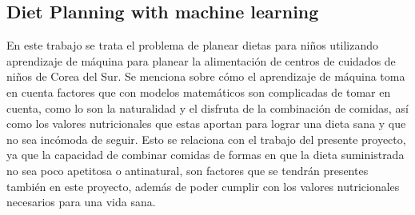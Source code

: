 \subsection{Diet Planning with machine learning}
En este trabajo se trata el problema de planear dietas para ni\~{n}os utilizando aprendizaje de m\'aquina para planear la alimentaci\'on de centros de cuidados de ni\~{n}os de Corea del Sur. Se menciona sobre c\'omo el aprendizaje de m\'aquina toma en cuenta factores que con modelos matem\'aticos son complicadas de tomar en cuenta, como lo son la naturalidad y el disfruta de la combinaci\'on de comidas, as\'i como los valores nutricionales que estas aportan para lograr una dieta sana y que no sea inc\'omoda de seguir. Esto se relaciona con el trabajo del presente proyecto, ya que la capacidad de combinar comidas de formas en que la dieta suministrada no sea poco apetitosa o antinatural, son factores que se tendr\'an presentes tambi\'en en este proyecto, adem\'as de poder cumplir con los valores nutricionales necesarios para una vida sana.\cite{nelsonFoodBudgetStandards2002}


